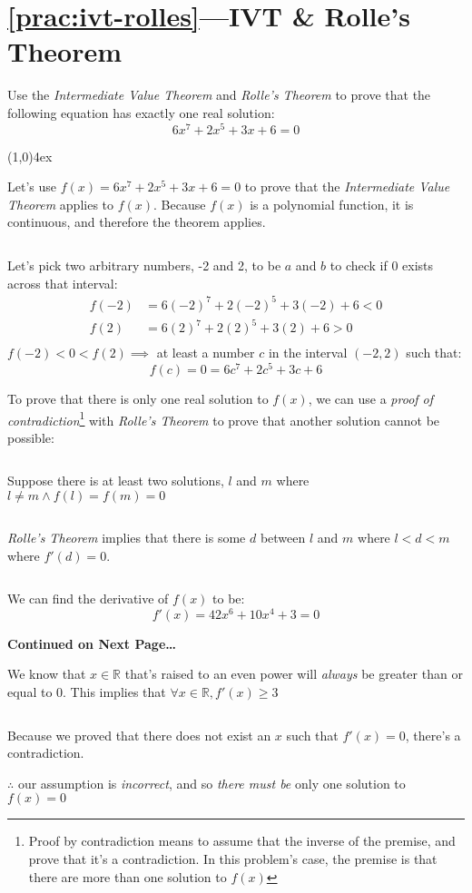 \documentclass{MathNotes}
\newcommand{\continued}{
	\mbox{}
	\vfill
	\textbf{Continued on Next Page\ldots}\newpage
}
\newcommand{\br}{
	\begin{center}
		\line(1,0){4ex}
	\end{center}}
\newcommand{\bl}{
	\newline$ $\newline
}
\begin{document}
\section*{\ref{prac:ivt-rolles}---IVT \& Rolle's Theorem}\label{ans:ivt-rolles}
Use the \textit{Intermediate Value Theorem} and \textit{Rolle's Theorem} to
prove that the following equation has exactly one real solution:
$$6x^7+2x^5+3x+6=0$$
\br
Let's use $f(x)=6x^7+2x^5+3x+6=0$ to prove that the \textit{Intermediate
	Value Theorem} applies to $f(x)$. Because $f(x)$ is a polynomial function, it
is continuous, and therefore the theorem applies.
\bl
Let's pick two arbitrary numbers, -2 and 2, to be $a$ and $b$ to check if $0$ exists
across that interval:
\begin{align*}
	f(-2) & =6(-2)^7+2(-2)^5+3(-2)+6 < 0 \\
	f(2)  & =6(2)^7+2(2)^5+3(2)+6 > 0    \\
\end{align*}
$f(-2)<0<f(2)\implies$ at least a number $c$ in the interval $(-2, 2)$ such
that: $$f(c)=0=6c^7+2c^5+3c+6$$

To prove that there is only one real solution to $f(x)$, we can use a
\textit{proof of contradiction}\footnote{Proof by contradiction means to assume
	that the inverse of the premise, and prove that it's a contradiction. In this
	problem's case, the premise is that there are more than one solution to $f(x)$}
with \textit{Rolle's Theorem} to prove that
another solution cannot be possible:
\bl
{}
Suppose there is at least two solutions, $l$ and $m$ where
$l\neq m\land f(l)=f(m)=0$
\bl
\textit{Rolle's Theorem} implies that there is some $d$ between $l$ and $m$
where $l<d<m$ where $f'(d)=0$.
\bl
We can find the derivative of $f(x)$ to be:
$$f'(x)=42x^6+10x^4+3=0$$

\continued
{}
We know that $x\in\mathbb{R}$ that's raised to an even power will
\textit{always} be greater than or equal to 0. This implies that
$\forall x\in\mathbb{R},f'(x)\geq3$
\bl
Because we proved that there does not exist an $x$ such that $f'(x)=0$, there's
a contradiction.

$\therefore$ our assumption is \textit{incorrect}, and so \textit{there must be}
only one solution to $f(x)=0$
\end{document}

